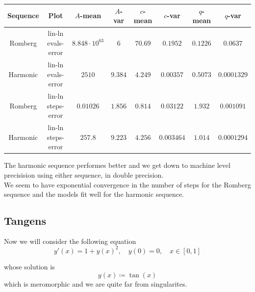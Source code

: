 \begin{table}[H]
    \centering
    \small
     \begin{tabular}{c|c||c|c|c|c|c|c}
Sequence & Plot & \(A\)-mean & \(A\)-var & \(c\)-mean & \(c\)-var & \(q\)-mean & \(q\)-var\\\hline
\rowcolor{red}
Romberg & lin-ln evals-error & \(8.848\cdot 10^{63}\) & \(6\) & \(70.69\) & \(0.1952\) & \(0.1226\) & \(0.0637\) \\
\rowcolor{green}
Harmonic & lin-ln evals-error & \(2510\) & \(9.384\) & \(4.249\) & \(0.00357\) & \(0.5073\) & \(0.0001329\) \\
\rowcolor{green}
Romberg & lin-ln steps-error & \(0.01026\) & \(1.856\) & \(0.814\) & \(0.03122\) & \(1.932\) & \(0.001091\) \\
\rowcolor{green}
Harmonic & lin-ln steps-error & \(257.8\) & \(9.223\) & \(4.256\) & \(0.003464\) & \(1.014\) & \(0.0001294\) \\
    \end{tabular}
    \label{tab:my_label}
\end{table}

The harmonic sequence performes better and we get down to machine level precisision using either sequence, in double precision.\\

We seem to have exponential convergence in the number of steps for the Romberg sequence and the models fit well for the harmonic sequence.\\

\subsection{Tangens}

Now we will consider the following equation
\begin{equation}
y'(x) = 1 + y(x)^2, \quad y(0) = 0,\quad x\in [0,1]
\end{equation}

whose solution is 
\[
y(x) \coloneqq \tan(x)
\]
which is meromorphic and we are quite far from singularites.

